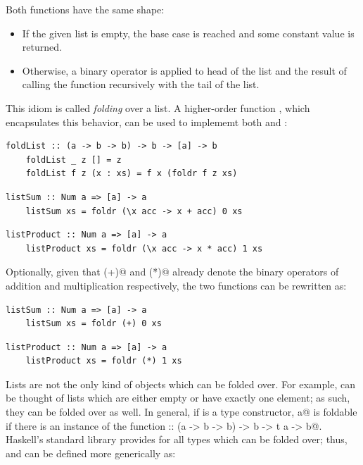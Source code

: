\documentclass[UdineBachThesis,american,11pt,draft]{PhdThesis}
\begin{document}
  Both functions have the same shape:

  \begin{itemize}
    \item If the given list is empty, the base case is reached and some constant
    value is returned.

    \item Otherwise, a binary operator is applied to head of the list and the
    result of calling the function recursively with the tail of the list.
  \end{itemize}

  This idiom is called \emph{folding} over a list. A higher-order function
  \lstinline@foldList@, which encapsulates this behavior, can be used to
  implememt both \lstinline@listSum@ and \lstinline@listProduct@:

  \begin{lstlisting}[gobble=4,basicstyle=\ttfamily\small]
    foldList :: (a -> b -> b) -> b -> [a] -> b
    foldList _ z [] = z
    foldList f z (x : xs) = f x (foldr f z xs)
  \end{lstlisting}

  \begin{lstlisting}[gobble=4,basicstyle=\ttfamily\small]
    listSum :: Num a => [a] -> a
    listSum xs = foldr (\x acc -> x + acc) 0 xs
  \end{lstlisting}

  \begin{lstlisting}[gobble=4,basicstyle=\ttfamily\small]
    listProduct :: Num a => [a] -> a
    listProduct xs = foldr (\x acc -> x * acc) 1 xs
  \end{lstlisting}

  Optionally, given that \lstinline@(+)@ and \lstinline@(*)@ already denote the
  binary operators of addition and multiplication respectively, the two
  functions can be rewritten as:

  \begin{lstlisting}[gobble=4,basicstyle=\ttfamily\small]
    listSum :: Num a => [a] -> a
    listSum xs = foldr (+) 0 xs
  \end{lstlisting}

  \begin{lstlisting}[gobble=4,basicstyle=\ttfamily\small]
    listProduct :: Num a => [a] -> a
    listProduct xs = foldr (*) 1 xs
  \end{lstlisting}

  Lists are not the only kind of objects which can be folded over. For example,
  \lstinline@Maybe@s can be thought of lists which are either empty or have
  exactly one element; as such, they can be folded over as well. In general, if
  \lstinline@t@ is a type constructor, \lstinline@t a@ is foldable if there is
  an instance of the function
  \lstinline@foldr :: (a -> b -> b) -> b -> t a -> b@. Haskell's standard
  library provides \lstinline@foldr@ for all types which can be folded over;
  thus, \lstinline@listSum@ and \lstinline@listProduct@ can be defined more
  generically as:
\end{document}
